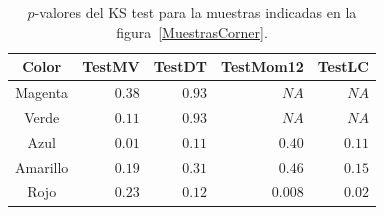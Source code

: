 \begin{table}[htb]
	\centering
	\caption{\label{pvaluesTrueNestedSamples} $p$-valores del KS test para la muestras indicadas en la figura~\ref{MuestrasCorner}.}
	\begin{tabular}{c*4{r}}
		\toprule
		Color       &  TestMV    &  TestDT    &  TestMom12  &  TestLC\\
		\midrule
		Magenta     & $ 0.38$    & $ 0.93 $   & $ NA $     & $  NA$\\
		Verde       & $ 0.11$    & $ 0.93$    & $ NA $     & $   NA$\\
		Azul        & $ 0.01 $   & $0.11 $    & $ 0.40$    & $ 0.11$\\
		Amarillo    & $0.19$     & $0.31$     & $ 0.46 $   & $0.15$\\
		Rojo        & $0.23$     & $0.12$     & $ 0.008$   & $0.02$\\
		\bottomrule
	\end{tabular}
\end{table}

